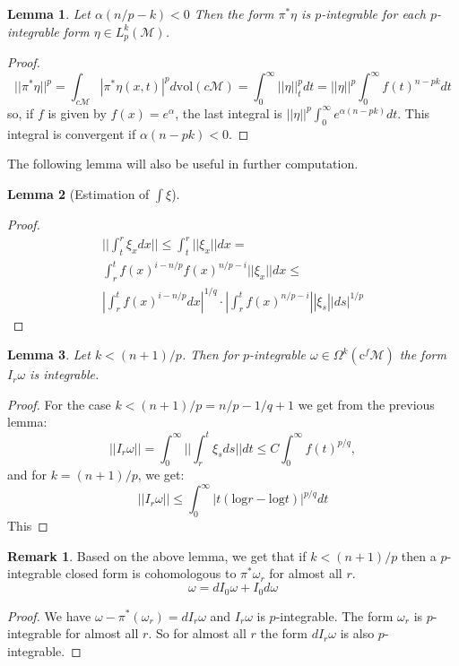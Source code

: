 \documentclass[licencjacka]{pracamgr}
\theoremstyle{definition}
\theoremstyle{definition}
\newtheorem{remark}{Remark}[section]
\theoremstyle{plain}
\newtheorem{lemma}{Lemma}[section]
\theoremstyle{plain}
\begin{document}
\begin{lemma}
Let $ \alpha (n/p - k) < 0 $ Then the form $\pi^\ast \eta$ is
$p$-integrable for each $p$-integrable form $\eta \in
L^k_p(\mathcal{M})$.
\end{lemma}
\begin{proof}
\[
    ||\pi^\ast \eta ||^p = 
    \int_{c \mathcal{M}} |\pi^\ast \eta(x,t)|^p d \mathrm{vol}(c\mathcal{M}) = 
    \int_0^\infty ||\eta||_t^p dt = ||\eta||^p \int_0^\infty f(t)^{n-pk} dt
\]
so, if $f$ is given by $f(x) = e^\alpha$, the last integral is  
$ ||\eta||^p \int_0^\infty e^{\alpha (n-pk)} dt$. This integral is convergent
if $\alpha (n - pk) < 0$.
\end{proof}

The following lemma will also be useful in further computation.
\begin{lemma}[Estimation of $\int \xi$]
\end{lemma}
\begin{proof}  %
\begin{multline*}
    || \int_t^r \xi_x dx || \leq
     \int_t^r || \xi_x || dx  =  \\
     \int_r^t f(x)^{i - n/p} f(x)^{n/p - i} || \xi_x || dx  \leq  \\
   | \int_r^t f(x)^{i - n/p} dx|^{1/q} \cdot
   |\int_r^t f(x)^{n/p - i} || \xi_s || ds |^{1/p}
\end{multline*}
\end{proof}


\begin{lemma}
   Let $k < (n+1)/p$. Then for $p$-integrable $\omega \in
   \Omega^k(\mathrm{c}^f\mathcal{M})$ the form $I_r\omega$ is
   integrable.
\end{lemma}
\begin{proof}
  For the case $k < (n+1)/p = n/p - 1/q + 1$ we get from the previous lemma:
\[
||I_r\omega|| = \int_0^\infty ||\int_r^t \xi_s ds|| dt \leq
 C \int_0^\infty f(t)^{p/q},
\]
and for $k=(n+1)/p$, we get:
\[
  ||I_r\omega|| \leq \int_0^\infty | t(\mathrm{log} r - \mathrm{log} t)  |^{p/q} dt
\]
This 
\end{proof}

\begin{remark} %
  Based on the above lemma, we get that if $k<(n+1)/p$ then a $p$-integrable
closed form is cohomologous to $\pi^\ast \omega_r$ for almost all $r$.
\[
    \omega = dI_0\omega + I_0d\omega
\]
\end{remark}
\begin{proof}
  We have $\omega - \pi^\ast(\omega_r) = dI_r\omega$ and $I_r \omega$ is 
$p$-integrable. The form $\omega_r$ is $p$-integrable for almost all $r$.
So for almost all $r$ the form $dI_r\omega$ is also $p$-integrable.
\end{proof}
\end{document}
